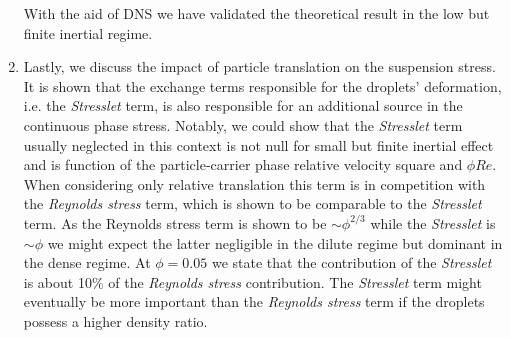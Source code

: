 \begin{enumerate}
    With the aid of DNS we have validated the theoretical result in the low but finite inertial regime. 
    \item 
    Lastly, we discuss the impact of particle translation on the suspension stress. 
    It is shown that the exchange terms responsible for the droplets' deformation, i.e. the \textit{Stresslet} term, is also responsible for an additional source in the continuous phase stress. 
    Notably, we could show that the \textit{Stresslet} term usually neglected in this context is not null for small but finite inertial effect and is function of the particle-carrier phase relative velocity square and $\phi Re$.  
    When considering only relative translation this term is in competition with the \textit{Reynolds stress} term, which is shown to be comparable to the \textit{Stresslet} term. 
    As the Reynolds stress term is shown to be $\sim \phi^{2/3}$ while the \textit{Stresslet} is $\sim \phi$ we might expect the latter negligible in the dilute regime but dominant in the dense regime. 
    At $\phi = 0.05$ we state that the contribution of the \textit{Stresslet} is about 10\% of the \textit{Reynolds stress} contribution. 
    The \textit{Stresslet} term might eventually be more important than the \textit{Reynolds stress} term if the droplets possess a higher density ratio. 
\end{enumerate}